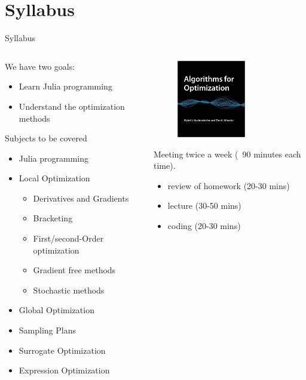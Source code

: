 \documentclass{beamer}
\begin{document}
\section{Syllabus}
\begin{frame}{Syllabus}

    
\begin{columns}

\begin{column}{.6\textwidth}
We have two goals: 
\begin{itemize}
    \item Learn Julia programming
    \item Understand the optimization methods
\end{itemize}
Subjects to be covered
\begin{itemize}
    \item Julia programming
    \item Local Optimization
    \begin{itemize}
        \item Derivatives and Gradients
        \item Bracketing
        \item First/second-Order optimization
        \item Gradient free methods
        \item Stochastic methods
    \end{itemize}
    \item Global Optimization
    \item Sampling Plans
    \item Surrogate Optimization
    \item Expression Optimization

\end{itemize}
\end{column}
\begin{column}{.4\textwidth}
\begin{figure}
\centering
\includegraphics[width=30mm]{Figs/algo_opt.jpg}
\end{figure}
Meeting twice a week (~90 minutes each time).\\
\begin{itemize}
    \item review of homework (20-30 mins)
    \item lecture (30-50 mins)
    \item coding (20-30 mins)
\end{itemize}
\end{column}

\end{columns}

\end{frame}
\end{document}

